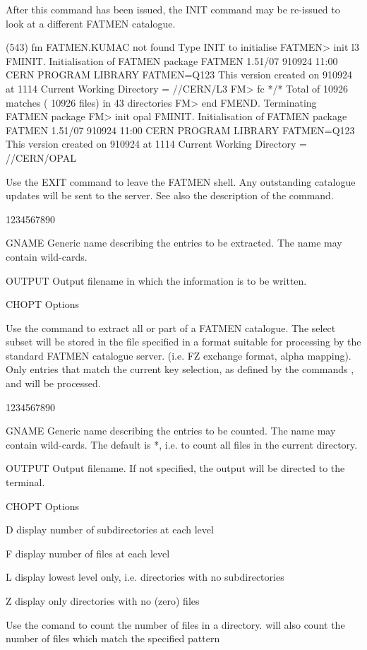 After this command has been issued, the INIT command
may be re-issued to look at a different FATMEN catalogue.
\begin{XMP}
[zfatal] (543) fm
 FATMEN.KUMAC not found
 Type INIT to initialise FATMEN> init l3
 FMINIT.  Initialisation of FATMEN package
 FATMEN   1.51/07 910924 11:00 CERN PROGRAM LIBRARY FATMEN=Q123
          This version created on      910924  at        1114 
 Current Working Directory = //CERN/L3
 FM> fc */*
 Total of  10926 matches ( 10926 files) in     43 directories
 FM> end
 FMEND. Terminating FATMEN package
 FM> init opal
 FMINIT.  Initialisation of FATMEN package
 FATMEN   1.51/07 910924 11:00 CERN PROGRAM LIBRARY FATMEN=Q123                
          This version created on      910924  at        1114 
 Current Working Directory = //CERN/OPAL
\end{XMP}
Use the EXIT command to leave the FATMEN shell.
Any outstanding catalogue updates will be sent to the server.
See also the description of the  command.
\begin{DLtt}{1234567890}
\item[GNAME]Generic name describing the entries to be extracted.
The name may contain wild-cards.
\item[OUTPUT]Output filename in which the information is to be written.
\item[CHOPT]Options
\end{DLtt}
Use the  command to extract all or part of a 
FATMEN catalogue. The select subset will be stored
in the file specified in a format suitable for processing
by the standard FATMEN catalogue server. (i.e. FZ exchange
format, alpha mapping).
Only entries that match the current key selection, as
defined by the commands , 
and  will be processed.
\begin{DLtt}{1234567890}
\item[GNAME]Generic name describing the entries to be counted.
The name may contain wild-cards. The default is *, i.e. to count
all files in the current directory.
\item[OUTPUT]Output filename. If not specified, the output will
be directed to the terminal.
\item[CHOPT]Options
\begin{DLtt}{12}
\item[D]display number of subdirectories at each level
\item[F]display number of files at each level
\item[L]display lowest level only, i.e. directories with no subdirectories
\item[Z]display only directories with no (zero) files
\end{DLtt}
\end{DLtt}
Use the  comand to count the number of files in a directory.
 will also count the number of files which match the specified pattern

